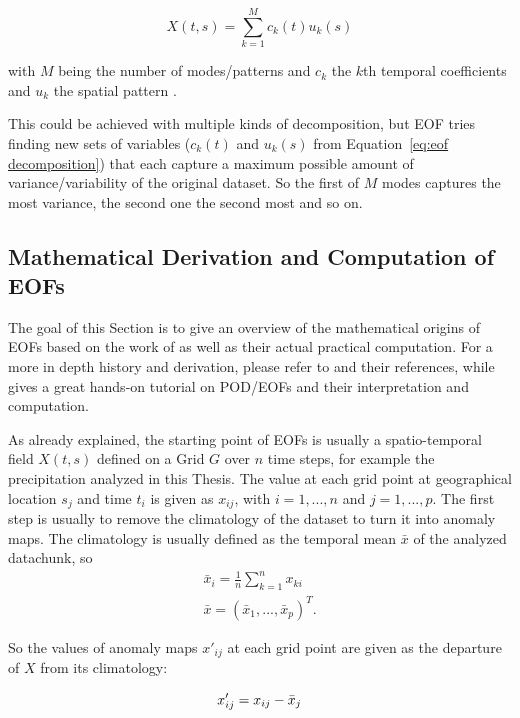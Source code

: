 \begin{equation}
  X(t, s) = \sum^{M}_{k=1} c_k(t) u_k(s)
  \label{eq:eof decomposition}
\end{equation}

with $M$ being the number of modes/patterns and  $c_k$ the $k$th temporal coefficients and $u_k$ the spatial pattern \cite{hannachi_empirical_2007}. 

This could be achieved with multiple kinds of decomposition, but EOF tries finding new sets of variables ($c_k(t)$ and $u_k(s)$ from Equation~\ref{eq:eof decomposition}) that each capture a maximum possible amount of variance/variability of the original dataset. 
So the first of $M$ modes captures the most variance, the second one the second most and so on. 

\subsection{Mathematical Derivation and Computation of EOFs}

The goal of this Section is to give an overview of the mathematical origins of EOFs based on the work of  as well as their actual practical computation. 
For a more in depth history and derivation, please refer to \cite{hannachi_empirical_2007} and their references, while  gives a great hands-on tutorial on POD/EOFs and their interpretation and computation. 

As already explained, the starting point of EOFs is usually a spatio-temporal field $X(t, s)$ defined on a Grid $G$ over $n$ time steps, for example the precipitation analyzed in this Thesis. 
The value at each grid point at geographical location $s_j$ and time $t_i$ is given as $x_{ij}$, with $i = 1, ..., n$  and $j = 1, ..., p$.  
The first step is usually to remove the climatology of the dataset to turn it into anomaly maps. 
The climatology is usually defined as the temporal mean $\bar{x}$ of the analyzed datachunk, so 
\begin{align}
  \bar{x}_i = \frac{1}{n} \sum^{n}_{k=1} x_{ki} \\
  \bar{x} = (\bar{x}_1, ..., \bar{x}_p)^T .
  \label{eq:climatology}
\end{align}

So the values of anomaly maps $x'_{ij}$ at each grid point are given as the departure of $X$ from its climatology: 



\begin{equation}
  x'_{ij} = x_{ij} - \bar{x}_j \\
  \label{eq:anomaly map elements}
\end{equation}


